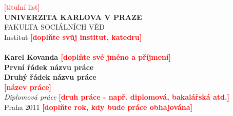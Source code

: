 \pagestyle{empty}
\begin{center}
\textcolor{red}{[titulní list]} \\
\textbf{\LARGE{UNIVERZITA KARLOVA V PRAZE}}\\
\Large{FAKULTA SOCI\'{A}LN\'{I}CH V\v{E}D}\\
\large{Institut }\normalsize{\textbf{\textcolor{red}{[doplňte svůj institut, katedru]}}} \\
\\ %
\textbf{\large{Karel Kovanda }}\normalsize{\textbf{\textcolor{red}{[doplňte své jméno a příjmení]}}} \\
\vspace{10mm} \textbf{\LARGE{První řádek názvu práce}\\
 \LARGE{Druhý řádek názvu práce}}\\
\normalsize{\textbf{\textcolor{red}{[název práce]}}} \\
\vspace{11mm} \textit{\Large{Diplomová práce}}
\normalsize{\textbf{\textcolor{red}{[druh práce - např. diplomová, bakalářská atd.]}}}\\
\vspace{40mm} \large{Praha 2011}
\normalsize{\textbf{\textcolor{red}{[doplňte rok, kdy bude práce
obhajována]}}}
\end{center}
\newpage


\pagestyle{empty}

\vfill

